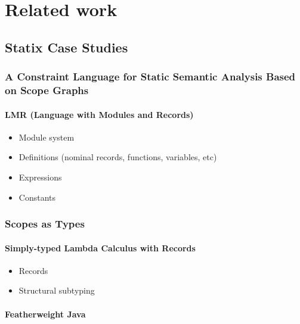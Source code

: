 
\chapter{\label{chap:related-work}Related work}

  \section{Statix Case Studies}

    \subsection{A Constraint Language for Static Semantic Analysis Based on Scope Graphs}

      \subsubsection{LMR (Language with Modules and Records)}

        \begin{itemize}
          \item Module system
          \item Definitions (nominal records, functions, variables, etc)
          \item Expressions
          \item Constants
        \end{itemize}

    \subsection{Scopes as Types}

      \subsubsection{Simply-typed Lambda Calculus with Records}

        \begin{itemize}
          \item Records
          \item Structural subtyping
        \end{itemize}

      \subsubsection{Featherweight Java}

